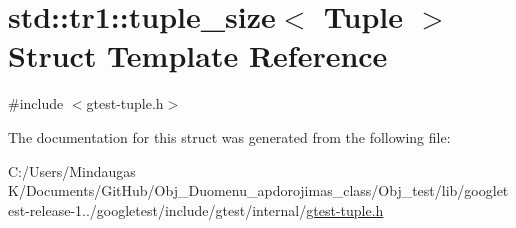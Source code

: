 \hypertarget{structstd_1_1tr1_1_1tuple__size}{}\section{std\+::tr1\+::tuple\+\_\+size$<$ Tuple $>$ Struct Template Reference}
\label{structstd_1_1tr1_1_1tuple__size}


{\ttfamily \#include $<$gtest-\/tuple.\+h$>$}



The documentation for this struct was generated from the following file\+:\begin{DoxyCompactItemize}
\item 
C\+:/\+Users/\+Mindaugas K/\+Documents/\+Git\+Hub/\+Obj\+\_\+\+Duomenu\+\_\+apdorojimas\+\_\+class/\+Obj\+\_\+test/lib/googletest-\/release-\/1../googletest/include/gtest/internal/\mbox{\hyperlink{gtest-tuple_8h}{gtest-\/tuple.\+h}}\end{DoxyCompactItemize}
